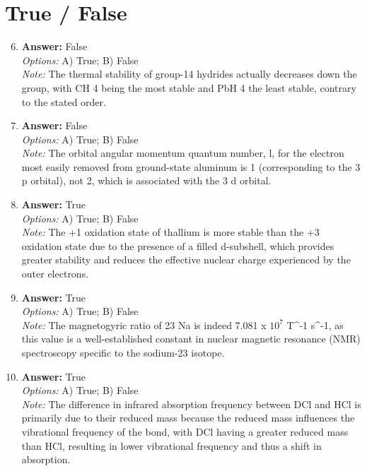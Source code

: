 \documentclass[12pt]{article}
\begin{document}
\section*{True / False}
\begin{enumerate}[label=\arabic*.]
\setcounter{enumi}{5}
\item \textbf{Answer:} False
\\ \textit{Options:} A) True; B) False
\\ \textit{Note:} The thermal stability of group-14 hydrides actually decreases down the group, with CH 4 being the most stable and PbH 4 the least stable, contrary to the stated order.
\item \textbf{Answer:} False
\\ \textit{Options:} A) True; B) False
\\ \textit{Note:} The orbital angular momentum quantum number, l, for the electron most easily removed from ground-state aluminum is 1 (corresponding to the 3 p orbital), not 2, which is associated with the 3 d orbital.
\item \textbf{Answer:} True
\\ \textit{Options:} A) True; B) False
\\ \textit{Note:} The +1 oxidation state of thallium is more stable than the +3 oxidation state due to the presence of a filled d-subshell, which provides greater stability and reduces the effective nuclear charge experienced by the outer electrons.
\item \textbf{Answer:} True
\\ \textit{Options:} A) True; B) False
\\ \textit{Note:} The magnetogyric ratio of 23 Na is indeed 7.081 x $10^7$ T^-1 s^-1, as this value is a well-established constant in nuclear magnetic resonance (NMR) spectroscopy specific to the sodium-23 isotope.
\item \textbf{Answer:} True
\\ \textit{Options:} A) True; B) False
\\ \textit{Note:} The difference in infrared absorption frequency between DCl and HCl is primarily due to their reduced mass because the reduced mass influences the vibrational frequency of the bond, with DCl having a greater reduced mass than HCl, resulting in lower vibrational frequency and thus a shift in absorption.
\end{enumerate}
\end{document}

